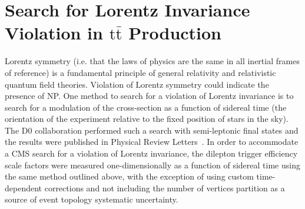 \section{Search for Lorentz Invariance Violation in \ensuremath{\mathrm{t\bar{t}}} Production}
Lorentz symmetry (i.e. that the laws of physics are the same in all inertial frames of reference) is a fundamental principle of general relativity and relativistic quantum field theories.
Violation of Lorentz symmetry could indicate the presence of NP.
One method to search for a violation of Lorentz invariance is to search for a modulation of the \ttbar cross-section as a function of sidereal time (the orientation of the experiment relative to the fixed position of stars in the sky).
The D0 collaboration performed such a search with semi-leptonic final states and the results were published in Physical Review Letters~\cite{PhysRevLett.108.261603}.
In order to accommodate a CMS search for a violation of Lorentz invariance, the dilepton trigger efficiency scale factors were measured one-dimensionally as a function of sidereal time using the same method outlined above, with the exception of using custom time-dependent corrections and not including the number of vertices partition as a source of event topology systematic uncertainty.

